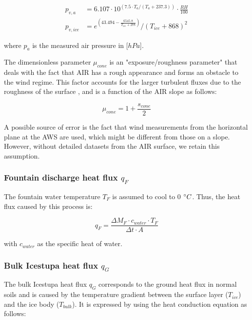 \documentclass[utf8]{frontiersSCNS} %
\begin{document}
\begin{equation}
	\begin{split}
		p_{v,a}&=6.107 \cdot 10^{(7.5 \cdot T_a / (T_a + 237.3))} \cdot \frac{RH}{100}\\
		p_{v,ice}&=e^{(43.494 - \frac{6545.8}{T_{ice} + 278})}/(T_{ice} + 868)^2
	\end{split} \label{eqn:vp}
\end{equation}

where $p_{a}$ is the measured air pressure in [$hPa$].

The dimensionless parameter $\mu_{cone}$ is an "exposure/roughness parameter" that deals with the fact that AIR has a
rough appearance and forms an obstacle to the wind regime. This factor accounts for the larger turbulent fluxes due to
the roughness of the surface \citep{Oerlemans_2021}, and is a function of the AIR slope as follows:

\begin{equation}
	\mu_{cone} = 1 + \frac{s_{cone}}{2}
\end{equation}

A possible source of error is the fact that wind measurements from the horizontal plane at the AWS are used, which might
be different from those on a slope. However, without detailed datasets from the AIR surface, we retain this assumption.

\subsubsection{Fountain discharge heat flux \texorpdfstring{$q_{F}$}{Lg} }

The fountain water temperature $T_F$ is assumed to cool to 0 $\degree C$. Thus, the heat flux caused by this process is:

\begin{equation}
	q_{F} = \frac{ \Delta M_F \cdot c_{water} \cdot T_F}{\Delta t \cdot A}
	\label{eqn:qF}
\end{equation}

with $c_{water}$ as the specific heat of water.

\subsubsection{Bulk Icestupa heat flux \texorpdfstring{$q_{G}$}{Lg}} \label{sec:Bulkflux}

The bulk Icestupa heat flux $q_{G}$ corresponds to the ground heat flux in normal soils and is caused by the temperature
gradient between the surface layer ($T_{ice}$) and the ice body ($T_{bulk}$). It is expressed by using the heat
conduction equation as follows:
\end{document}
